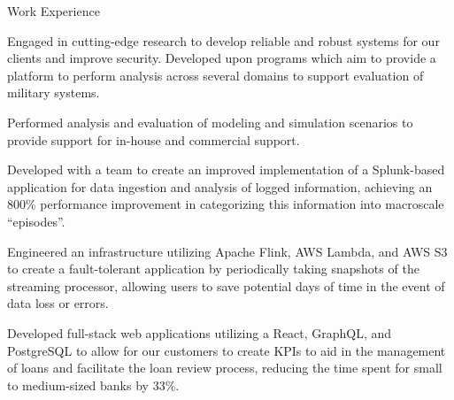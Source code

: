 \documentclass{resume} %
\begin{document}

\begin{workSection}{Work Experience}
    \experienceItem[
        company=Georgia Tech Research Institute (GTRI),
        location=Atlanta{,} GA,
        position=Graduate Research Assistant,
        duration=May 2024\textendash{Present}
    ]
    \begin{bullets}
        \item Engaged in cutting-edge research to develop reliable and robust systems for our clients and improve security. Developed upon programs which aim to provide a platform to perform analysis across several domains to support evaluation of military systems.
        \item Performed analysis and evaluation of modeling and simulation scenarios to provide support for in-house and commercial support.
    \end{bullets}
    
    \experienceItem[
        company=Splunk,
        location=San Jose{,} CA,
        position=Backend Software Engineer Intern,
        duration=May 2023\textendash{July 2023}
    ]
    \begin{bullets}
        \item Developed with a team to create an improved implementation of a Splunk-based application for data ingestion and analysis of logged information, achieving an 800\% performance improvement in categorizing this information into macroscale ``episodes''.
        \item Engineered an infrastructure utilizing Apache Flink, AWS Lambda, and AWS S3 to create a fault-tolerant application by periodically taking snapshots of the streaming processor, allowing users to save potential days of time in the event of data loss or errors.
    \end{bullets}
     
    \experienceItem[
        company=QwickRate,
        location=Marietta{,} GA (Remote),
        position=Software Engineer Intern,
        duration=August 2022\textendash{April 2023}
    ]
    \begin{bullets}
        \item Developed full-stack web applications utilizing a React, GraphQL, and PostgreSQL to allow for our customers to create KPIs to aid in the management of loans and facilitate the loan review process, reducing the time spent for small to medium-sized banks by 33\%.
    \end{bullets}


\end{workSection}
\end{document}
